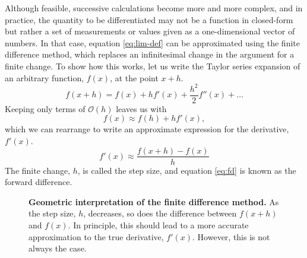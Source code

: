     Although feasible, successive calculations become more and more complex, and
    in practice, the quantity to be differentiated may not be a function in 
    closed-form but rather a set of measurements or values given as a 
    one-dimensional vector of numbers. In that case, equation \eqref{eq:lim-def}
    can be approximated using the finite difference method, which replaces an 
    infinitesimal change in the argument for a finite change. To show how this 
    works, let us write the Taylor series expansion of an arbitrary function, 
    $f(x)$, at the point $x+h$.
    \begin{equation}
        f(x+h) = f(x) + hf'(x) + \frac{h^2}{2}f''(x) + \dots
        \label{eq:f-tay}
    \end{equation}
    Keeping only terms of $\mathcal{O}(h)$ leaves us with
    \begin{equation}
        f(x) \approx f(h) + hf'(x),
    \end{equation}
    which we can rearrange to write an approximate expression for the derivative,
    $f'(x)$.
    \begin{equation}
        f'(x) \approx \frac{f(x+h)-f(x)}{h}
        \label{eq:fd}
    \end{equation}
    The finite change, $h$, is called the step size, and equation \eqref{eq:fd} 
    is known as the forward difference. 
    \begin{figure}[H]
        \centering
        \caption{\textbf{Geometric interpretation of the finite difference 
        method.} As the step size, $h$, decreases, so does the difference 
        between $f(x+h)$ and $f(x)$. In principle, this should lead to a more 
        accurate approximation to the true derivative, $f'(x)$. However, this is
        not always the case.}
        \label{fig:fd-schematic}
    \end{figure}
